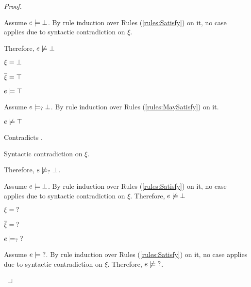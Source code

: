 \begin{proof}
\begin{byCases}
    Assume $e \models \bot$. By rule induction over Rules (\ref{rules:Satisfy}) on it, no case applies due to syntactic contradiction on $\xi$.
    
    Therefore, $e \not\models \bot$
    
\item[\text{(\ref{rule:CTFalsity})}]
    \begin{pfsteps*}
    \item $\xi=\bot$ 
    \item $\overline{\xi}=\top$ 
    \item $e \models \top$  
    \end{pfsteps*}
    Assume $e \models_{?} \bot$. By rule induction over Rules (\ref{rules:MaySatisfy}) on it.
    \begin{byCases}
    \item[\text{(\ref{rule:CMSExpEHole}),(\ref{rule:CMSExpHole}),(\ref{rule:CMSAp}),(\ref{rule:CMSMatch}),(\ref{rule:CMSPrl}),(\ref{rule:CMSPrr})}]
        \begin{pfsteps*}
        \item $e \not\models \top$ 
        \end{pfsteps*}
        Contradicts .
    \item
        Syntactic contradiction on $\xi$.
    \end{byCases}
    Therefore, $e \not\models_{?} \bot$.
    
    Assume $e \models \bot$. By rule induction over Rules (\ref{rules:Satisfy}) on it, no case applies due to syntactic contradiction on $\xi$. Therefore, $e \not\models \bot$
    
\item[\text{(\ref{rule:CTUnknown})}]
    \begin{pfsteps*}
    \item $\xi=\mathtt{?}$ 
    \item $\overline{\xi}=\mathtt{?}$ 
    \item $e \models_{?} \mathtt{?}$ 
    \end{pfsteps*}
    Assume $e \models \mathtt{?}$. By rule induction over Rules (\ref{rules:Satisfy}) on it, no case applies due to syntactic contradiction on $\xi$.
    Therefore, $e \not\models \mathtt{?}$.
    

\end{byCases}
\end{proof}
